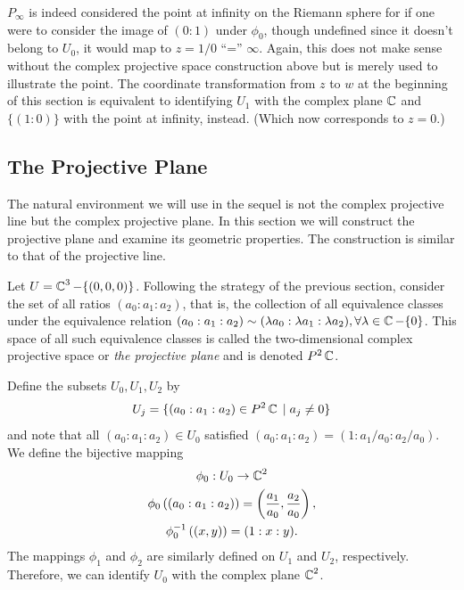 $P_\infty$ is indeed considered the point at infinity on the Riemann
sphere for if one were to consider the image of $(0 : 1)$ under
$\phi_0$, though undefined since it doesn't belong to $U_0$, it would
map to $z = 1 / 0$ ``='' $\infty$. Again, this does not make sense
without the complex projective space construction above but is merely
used to illustrate the point. The coordinate transformation from $z$ to
$w$ at the beginning of this section is equivalent to identifying $U_1$
with the complex plane $\operatorname{\mathbb{C}}$ and $\{(1 : 0)\}$ with the point at
infinity, instead. (Which now corresponds to $z=0$.)

\subsection{The Projective Plane}

The natural environment we will use in the sequel is not the complex
projective line but the complex projective plane. In this section we
will construct the projective plane and examine its geometric
properties. The construction is similar to that of the projective line.

Let $U = \operatorname{\mathbb{C}}^3 - \{(0,0,0)\}$. Following the strategy of the previous
section, consider the set of all ratios $(a_0 : a_1 : a_2)$, that is,
the collection of all equivalence classes under the equivalence relation
$(a_0 : a_1 : a_2) \sim (\lambda a_0 : \lambda a_1 : \lambda a_2),
\forall \lambda \in \operatorname{\mathbb{C}} - \{0\}$. This space of all such equivalence
classes is called the two-dimensional complex projective space or {\it
  the projective plane} and is denoted $P^2\operatorname{\mathbb{C}}$.

Define the subsets $U_0,U_1,U_2$ by
\[
    U_j = \{ (a_0 : a_1 : a_2) \in P^2\operatorname{\mathbb{C}} \; | \; a_j \neq 0 \}
\]
and note that all $(a_0 : a_1 : a_2) \in U_0$ satisfied $(a_0 : a_1 :
a_2) = (1 : a_1/a_0 : a_2/a_0)$. We define the bijective mapping
\begin{gather*}
    \phi_0 : U_0 \to \operatorname{\mathbb{C}}^2 \\
    \phi_0 \left( (a_0 : a_1 : a_2) \right)
    =
    \left( \frac{a_1}{a_0}, \frac{a_2}{a_0} \right), \\
    \phi_0^{-1} \left( (x,y) \right)
    =
    (1 : x : y).
\end{gather*}
The mappings $\phi_1$ and $\phi_2$ are similarly defined on $U_1$ and
$U_2$, respectively. Therefore, we can identify $U_0$ with the complex
plane $\operatorname{\mathbb{C}}^2$.

